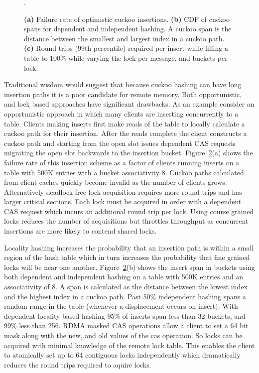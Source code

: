 \begin{figure}[t]
\begin{subfigure}{0.3\linewidth}
        \label{fig:tbd}
    \end{subfigure}.
    \vspace{-1em}
    \caption{
    \textbf{(a)} Failure rate of optimistic cuckoo insertions.
    \textbf{(b)} CDF of cuckoo spans for dependent and independent hashing. A cuckoo span is the distance between the smallest and largest index in a cuckoo path.
    \textbf{(c)} Round trips (99th percentile) required per insert while filling a table to 100\% while varying the lock per message, and buckets per lock. 
    }
    \label{fig:cuckoo-problems}

\end{figure}



Traditional wisdom would suggest that because cuckoo hashing
can have long insertion paths it is a poor candidate for
remote memory. Both opportunistic, and lock based approaches
have significant drawbacks.
As an example consider an opportunistic approach in which
many clients are inserting concurrently to a table. Clients
making inserts first make reads of the table to locally
calculate a cuckoo path for their insertion. After the reads
complete the client constructs a cuckoo path and starting
from the open slot issues dependent CAS requests migrating
the open slot backwards to the insertion bucket.
Figure~\ref{fig:cuckoo-problems}(a) shows the failure rate
of this insertion scheme as a factor of clients running
inserts on a table with 500K entries with a bucket
associativity 8. Cuckoo paths calculated from client caches
quickly become invalid as the number of clients grows.
Alternatively deadlock free lock acquisition requires more
round trips and has larger critical sections. Each lock must
be acquired in order with a dependent CAS request which
incurs an additional round trip per lock. Using course
grained locks reduces the number of acquisitions but
throttles throughput as concurrent insertions are more
likely to contend shared locks.

Locality hashing increases the probability that an insertion
path is within a small region of the hash table which in
turn increases the probability that fine grained locks will
be near one another. 
Figure~\ref{fig:cuckoo-problems}(b) shows the insert span in
buckets using both dependent and independent hashing on a
table with 500K entries and an associativity of 8. A span is
calculated as the distance between the lowest index and the
highest index in a cuckoo path. Past 50\% independent
hashing spans a random range in the table (whenever a
displacement occurs on insert). With dependent locality
based hashing 95\% of inserts span less than 32 buckets, and
99\% less than 256.
RDMA masked CAS operations allow a client to set a 64 bit
mask along with the new, and old values of the cas
operation. So locks can be acquired with minimal knowledge
of the remote lock table. This enables the client to
atomically set up to 64 contiguous locks independently which
dramatically reduces the round trips required to aquire
locks.

